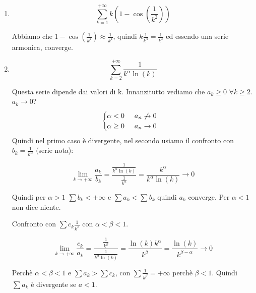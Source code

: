 \begin{exercise}
\begin{enumerate}
    Utilizziamo il confronto:

    \begin{equation*}
        a_k=e^{\frac{1}{k}}-1\hspace{1cm}b_k=\frac{1}{k}\hspace{1cm}\frac{a_k}{b_k}=\frac{e^{\frac{1}{k}}-1}{\frac{1}{k}}=1
    \end{equation*}
    
    Dato che $\sum e^{\frac{1}{k}}-1\approx\sum \frac{1}{k}$ e $\sum\frac{1}{k}=+\infty$, $\sum e^{\frac{1}{k}}-1$ è divergente.
    
    \item \begin{equation*}\sum^{+\infty}_{k=1}k(1-\cos(\frac{1}{k^2}))\end{equation*}
    
    Abbiamo che $1-\cos(\frac{1}{k^2})\approx\frac{1}{k^4}$, quindi $k\frac{1}{k^4}=\frac{1}{k^3}$ ed essendo una serie armonica, converge.
    
    \item \begin{equation*}\sum^{+\infty}_{k=2}\frac{1}{k^\alpha\ln(k)}\end{equation*}
    
    Questa serie dipende dai valori di k. Innanzitutto vediamo che $a_k\geq0$ $\forall k\geq2$. $a_k\to0$?
    \begin{equation*}
    \begin{cases}
        \alpha<0\hspace{.5cm}a_n\not\to0\\
        \alpha\geq0\hspace{.5cm}a_n\to0
    \end{cases}
    \end{equation*}
    Quindi nel primo caso è divergente, nel secondo usiamo il confronto con $b_k=\frac{1}{k^\alpha}$ (serie nota):
    
    \begin{equation*}
        \lim_{k\to+\infty}\frac{a_k}{b_k}=\frac{\frac{1}{k^\alpha\ln(k)}}{\frac{1}{k^\alpha}}=\frac{k^\alpha}{k^\alpha\ln(k)}\to0
    \end{equation*}
    
    Quindi per $\alpha>1$ $\sum b_k<+\infty$ e $\sum a_k<\sum b_k$ quindi $a_k$ converge. Per $\alpha<1$ non dice niente.
    
    Confronto con $\sum c_k\frac{1}{k^\beta}$ con $\alpha<\beta<1$.
    
    \begin{equation*}
        \lim_{k\to+\infty}\frac{c_k}{a_k}=\frac{\frac{1}{k^\beta}}{\frac{1}{k^\alpha\ln(k)}}=\frac{\ln(k)k^\alpha}{k^\beta}=\frac{\ln(k)}{k^{\beta-\alpha}}\to0
    \end{equation*}
    
    Perchè $\alpha<\beta<1$ e $\sum a_k>\sum c_k$, con $\sum\frac{1}{k^\beta}=+\infty$ perchè $\beta<1$. Quindi $\sum a_k$ è divergente se $a<1$.
    \end{enumerate}
\end{exercise}

